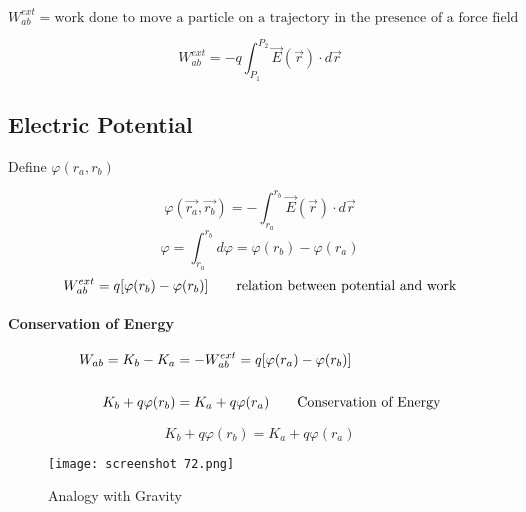 \documentclass[svgnames]{article}   	%
\begin{document}
\[
  W_{ab}^{ext} = \text{work done to move a particle on a trajectory in the
  presence of a force field}
\]

\vspace{5px} \[
  W_{ab}^{ext} = -q\int_{P_1}^{P_2} \vec{E}(\vec{r}) \cdot d\vec{r} 
\] \vspace{5px}
\subsection{Electric Potential} 

Define $\varphi(r_a, r_b)$

\vspace{5px} \[
  \varphi(\vec{r_a}, \vec{r_b}) = -\int_{r_a}^{r_b} \vec{E}(\vec{r}) \cdot
  d\vec{r} 
\] \vspace{5px}
\[
  \varphi = \int_{r_a}^{r_b} d\varphi = \varphi(r_b) - \varphi(r_a) 
\]
\vspace{5px} \[
  W_{ab}^{ext} = q[\varphi(r_b) - \varphi(r_b)] \hspace{20px} \text{relation
  between potential and work}
\] \vspace{5px}

\paragraph{Conservation of Energy}

\begin{align*}
  W_{ab} = K_b - K_a  &= -W_{ab}^{ext} = q[\varphi(r_a) - \varphi(r_b)] \\\\
  K_b + q\varphi(r_b) &= K_a + q\varphi(r_a) \hspace{20px} \text{Conservation of
  Energy} 
\end{align*}

\begin{tcolorbox}[title = Conservatino of Energy]

  \[
  K_b + q\varphi(r_b) = K_a + q\varphi(r_a)
  \]

\end{tcolorbox}

\begin{figure}[H]
  \centering
    \texttt{[image: screenshot 72.png]}
    \caption{Analogy with Gravity}
\end{figure}
\end{document}
